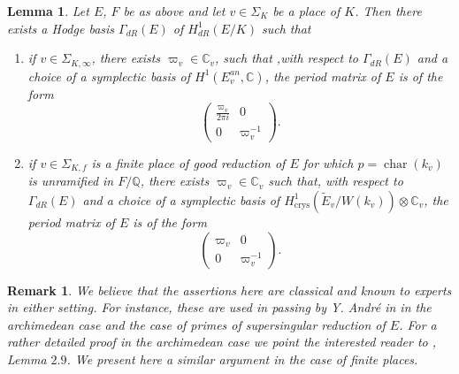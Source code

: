 \documentclass[12pt,twoside,a4paper]{article}
\theoremstyle{plain}%
\newtheorem{lemma}[theorem]{Lemma}
\newtheorem{remark}[theorem]{Remark}
\DeclareMathOperator{\chara}{char}
\DeclareMathOperator{\crys}{crys}
\newcommand{\C}{\mathbb{C}}
\newcommand{\Q}{\mathbb{Q}}
\begin{document}
\begin{lemma}\label{lemmacmperiods} Let $E$, $F$ be as above and let $v\in \Sigma_{K}$ be a place of $K$. Then there exists a Hodge basis $\Gamma_{dR}(E)$ of $H^1_{dR}(E/K)$ such that 
	\begin{enumerate}
		\item if $v\in \Sigma_{K,\infty}$, there exists $\varpi_v\in \C_v$, such that ,with respect to $\Gamma_{dR}(E)$ and a choice of a symplectic basis of $H^1(E_v^{an}, \C)$, the period matrix of $E$ is of the form \begin{equation}\label{eq:cmperarch}
			\begin{pmatrix}\frac{\varpi_v}{2\pi i}&0\\
				0& \varpi_v^{-1}
			\end{pmatrix}.\end{equation}
		
		\item if $v\in \Sigma_{K,f}$ is a finite place of good reduction of $E$ for which $p=\chara(k_v)$ is unramified in $F/\Q$, there exists $\varpi_v\in \C_v$ such that, with respect to $\Gamma_{dR}(E)$ and a choice of a symplectic basis of $H^1_{\crys}(\tilde{E}_v/W(k_v))\otimes \C_v$, the period matrix of $E$ is of the form \begin{equation}\label{eq:cmpernonarch}
			\begin{pmatrix}\varpi_v&0\\
				0& \varpi_v^{-1}
			\end{pmatrix}.
		\end{equation}
	\end{enumerate}
\end{lemma}
\begin{remark}
	We believe that the assertions here are classical and known to experts in either setting. For instance, these are used in passing by Y. Andr\'e in \cite{andremots} in the archimedean case and the case of primes of supersingular reduction of $E$. For a rather detailed proof in the archimedean case we point the interested reader to \cite{papaseffbrsieg}, Lemma $2.9$. We present here a similar argument in the case of finite places.
\end{remark}
\end{document}
